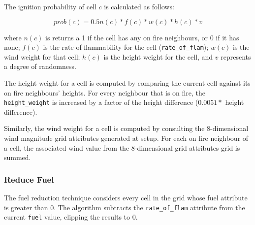 \documentclass[11pt, a4paper, titlepage]{article}
\newcommand{\code}[1]{\colorbox{light-gray}{\texttt{#1}}}
\begin{document}
The ignition probability of cell $c$ is calculated as follows:

\[ prob(c) = 0.5n(c)*f(c)*w(c)*h(c)*v \]

where $n(c)$ is returns a 1 if the cell has any on fire neighbours, or 0 if it has none; $f(c)$ is the rate of flammability for the cell (\code{rate\_of\_flam}); $w(c)$ is the wind weight for that cell; $h(c)$ is the height weight for the cell, and $v$ represents a degree of randomness.

The height weight for a cell is computed by comparing the current cell against its on fire neighbours' heights. For every neighbour that is on fire, the \code{height\_weight} is increased by a factor of the height difference ($0.0051 *$ height difference).  

Similarly, the wind weight for a cell is computed by consulting the 8-dimensional wind magnitude grid attributes generated at setup. For each on fire neighbour of a cell, the associated wind value from the 8-dimensional grid attributes grid is summed.  










\subsubsection{Reduce Fuel}
The fuel reduction technique considers every cell in the grid whose fuel attribute is greater than 0. The algorithm subtracts the \code{rate\_of\_flam} attribute from the current \code{fuel} value, clipping the results to 0. 

\end{document}
